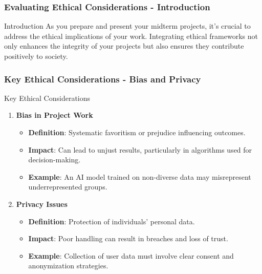 \documentclass{beamer}
\begin{document}
\begin{frame}[fragile]
    \frametitle{Evaluating Ethical Considerations - Introduction}
    \begin{block}{Introduction}
        As you prepare and present your midterm projects, it’s crucial to address the ethical implications of your work. Integrating ethical frameworks not only enhances the integrity of your projects but also ensures they contribute positively to society.
    \end{block}
\end{frame}

\begin{frame}[fragile]
    \frametitle{Key Ethical Considerations - Bias and Privacy}
    \begin{block}{Key Ethical Considerations}
        \begin{enumerate}
            \item \textbf{Bias in Project Work}
                \begin{itemize}
                    \item \textbf{Definition}: Systematic favoritism or prejudice influencing outcomes.
                    \item \textbf{Impact}: Can lead to unjust results, particularly in algorithms used for decision-making.
                    \item \textbf{Example}: An AI model trained on non-diverse data may misrepresent underrepresented groups.
                \end{itemize}
    
            \item \textbf{Privacy Issues}
                \begin{itemize}
                    \item \textbf{Definition}: Protection of individuals' personal data.
                    \item \textbf{Impact}: Poor handling can result in breaches and loss of trust.
                    \item \textbf{Example}: Collection of user data must involve clear consent and anonymization strategies.
                \end{itemize}
        \end{enumerate}
    \end{block}
\end{frame}
\end{document}
